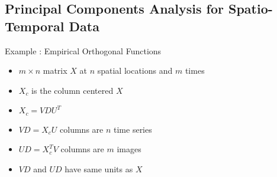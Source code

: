 \subsection{Principal Components Analysis for Spatio-Temporal Data}

\begin{frame}
  \begin{block}{Example \countex :  Empirical Orthogonal Functions}\pause
  \begin{itemize}
  \item $m\times n$ matrix $X$ at $n$ spatial locations and $m$ times
  \item $X_c$ is the column centered $X$
  \item $X_c = VDU^T$
  \item $VD = X_cU$ columns are $n$ time series
  \item $UD = X_c^TV$ columns are $m$ images
  \item $VD$ and $UD$ have same units as $X$
  \end{itemize}
  \end{block}
\end{frame}

